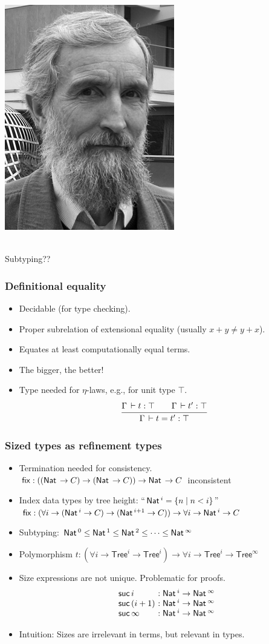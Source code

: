 \documentclass[t,fleqn]{beamer}
\makeatletter
\renewcommand{\ru}[2]{\dfrac{\begin{array}[b]{@{}c@{}} #1 \end{array}}{\begin{array}[t]{@{}l@{}} #2 \end{array}}}
\newcommand{\Tree}{\mathsf{Tree}}
\newcommand{\cAnn}{\color{red!80!black}}%
\renewcommand{\emph}[1]{{\cAnn#1}}
\newcommand{\mlsays}[1]{
\begin{frame}%
  \begin{minipage}[c]{0.5\linewidth}
   \includegraphics[height=0.9\textheight]{martin-loef-bw.png}
  \end{minipage}%
  \begin{minipage}[c]{0.5\linewidth}
   \begin{center}
     \bla \\[8ex]
     \Huge #1
   \end{center}
  \end{minipage}
\end{frame}
}
\makeatother
\begin{document}
\mlsays{Subtyping??}

\begin{frame}%
  \frametitle{Definitional equality}
  \begin{itemize}
  \item Decidable (for type checking).
  \item Proper subrelation of extensional equality (usually $x + y \not= y + x$).
  \item Equates at least computationally equal terms.
  \item The bigger, the better!
  \item Type needed for $\eta$-laws, e.g., for unit type $\top$.
\[
  \ru{\Gamma \der t : \top \qquad \Gamma \der t' : \top
    }{\Gamma \der t = t' : \top}
\]
\vspace{-2ex}
  \end{itemize}
\end{frame}




\begin{frame}%
  \frametitle{Sized types as refinement types}
  \begin{itemize}
  \item Termination needed for consistency.\\
    $\mathsf{fix} : ((\mathsf{Nat}\, \to C) \to (\mathsf{Nat}\, \to C)) \to \mathsf{Nat}\, \to C$
    inconsistent
  \item Index data types by tree height: ``$\mathsf{Nat}\,^i = \{ n \mid n < i \}$'' \\
    $\mathsf{fix} : (\forall i \to (\mathsf{Nat}\,^i \to C) \to (\mathsf{Nat}\,^{i+1} \to C))
    \to \forall i \to \mathsf{Nat}\,^i \to C$
  \item Subtyping: $\mathsf{Nat}\,^0 \leq \mathsf{Nat}\,^1 \leq \mathsf{Nat}\,^2 \leq \dots \leq
    \mathsf{Nat}\,^\infty$
  \item Polymorphism $t : (\forall i \to \Tree^i \to \Tree^i) \to
    \forall i \to \Tree^i \to \Tree^\infty$
  \item Size expressions are not unique.  Problematic for proofs.
\[
\begin{array}{l@{~ : \Nat^i \to \Nat^\infty}}
  \tsuc\,i \\
  \tsuc\,(i + 1) \\
  \tsuc\,\infty
\end{array}
\]
\vspace{-2ex}
  \item Intuition: Sizes are \emph{irrelevant} in terms, but \emph{relevant} in types.
  \end{itemize}
\end{frame}
\end{document}
